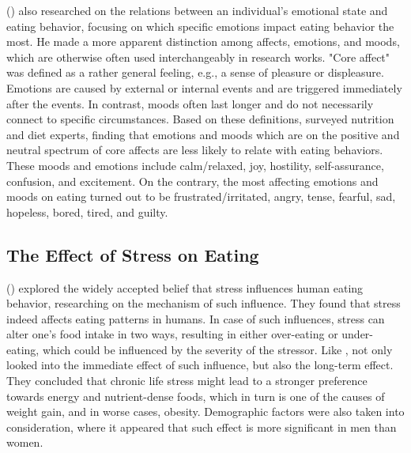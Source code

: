 \noindent \citeauthor{16_martin} (\citeyear{16_martin}) also researched on the relations between an individual's emotional state and eating behavior, focusing on which specific emotions impact eating behavior the most. He made a more apparent distinction among affects, emotions, and moods, which are otherwise often used interchangeably in research works. "Core affect" was defined as a rather general feeling, e.g., a sense of pleasure or displeasure. Emotions are caused by external or internal events and are triggered immediately after the events. In contrast, moods often last longer and do not necessarily connect to specific circumstances. Based on these definitions, \citeauthor{16_martin} surveyed nutrition and diet experts, finding that emotions and moods which are on the positive and neutral spectrum of core affects are less likely to relate with eating behaviors. These moods and emotions include calm/relaxed, joy, hostility, self-assurance, confusion, and excitement. On the contrary, the most affecting emotions and moods on eating turned out to be frustrated/irritated, angry, tense, fearful, sad, hopeless, bored, tired, and guilty.

\subsection{The Effect of Stress on Eating}
\citeauthor{5_stress_eating} (\citeyear{5_stress_eating}) explored the widely accepted belief that stress influences human eating behavior, researching on the mechanism of such influence. They found that stress indeed affects eating patterns in humans. In case of such influences, stress can alter one's food intake in two ways, resulting in either over-eating or under-eating, which could be influenced by the severity of the stressor. Like \citeauthor{4_mood_eat}, \citeauthor{5_stress_eating} not only looked into the immediate effect of such influence, but also the long-term effect. They concluded that chronic life stress might lead to a stronger preference towards energy and nutrient-dense foods, which in turn is one of the causes of weight gain, and in worse cases, obesity. Demographic factors were also taken into consideration, where it appeared that such effect is more significant in men than women.


